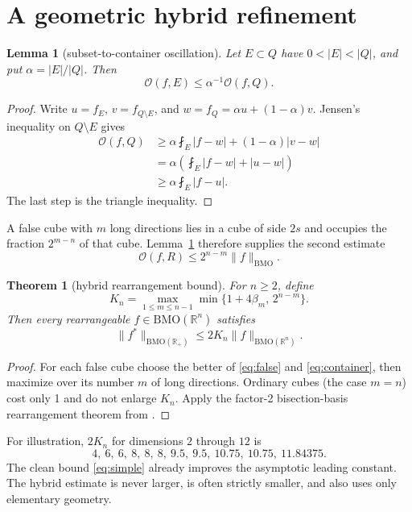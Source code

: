 \documentclass[11pt]{article}
\newtheorem{theorem}{Theorem}
\newtheorem{lemma}{Lemma}
\newcommand{\BMO}{\mathrm{BMO}}
\newcommand{\cO}{\mathcal O}
\begin{document}
\section{A geometric hybrid refinement}

\begin{lemma}[subset-to-container oscillation]\label{lem:subset}
Let $E\subset Q$ have $0<|E|<|Q|$, and put $\alpha=|E|/|Q|$.  Then
\[
 \cO(f,E)\le \alpha^{-1}\cO(f,Q).
\]
\end{lemma}

\begin{proof}
Write $u=f_E$, $v=f_{Q\setminus E}$, and
$w=f_Q=\alpha u+(1-\alpha)v$.  Jensen's inequality on $Q\setminus E$ gives
\begin{align*}
 \cO(f,Q)
 &\ge \alpha\fint_E|f-w|+(1-\alpha)|v-w|\\
 &=\alpha\left(\fint_E|f-w|+|u-w|\right)\\
 &\ge\alpha\fint_E|f-u|.
\end{align*}
The last step is the triangle inequality.
\end{proof}

A false cube with $m$ long directions lies in a cube of side $2s$ and
occupies the fraction $2^{m-n}$ of that cube.  Lemma~\ref{lem:subset}
therefore supplies the second estimate
\begin{equation}\label{eq:container}
 \cO(f,R)\le 2^{n-m}\|f\|_{\BMO}.
\end{equation}

\begin{theorem}[hybrid rearrangement bound]\label{thm:hybrid}
For $n\ge2$, define
\[
 K_n=\max_{1\le m\le n-1}
 \min\{1+4\beta_m,\,2^{n-m}\}.
\]
Then every rearrangeable $f\in\BMO(\mathbb R^n)$ satisfies
\begin{equation}\label{eq:hybrid}
 \boxed{\ \|f^*\|_{\BMO(\mathbb R_+)}
 \le 2K_n\|f\|_{\BMO(\mathbb R^n)}.\ }
\end{equation}
\end{theorem}

\begin{proof}
For each false cube choose the better of \eqref{eq:false} and
\eqref{eq:container}, then maximize over its number $m$ of long directions.
Ordinary cubes (the case $m=n$) cost only 1 and do not enlarge $K_n$.
Apply the factor-2 bisection-basis rearrangement theorem from \cite{BDG}.
\end{proof}

For illustration, $2K_n$ for dimensions $2$ through $12$ is
\[
4,\ 6,\ 6,\ 8,\ 8,\ 8,\ 9.5,\ 9.5,\ 10.75,\ 10.75,\ 11.84375.
\]
The clean bound \eqref{eq:simple} already improves the asymptotic leading
constant.  The hybrid estimate is never larger, is often strictly smaller,
and also uses only elementary geometry.
\end{document}
